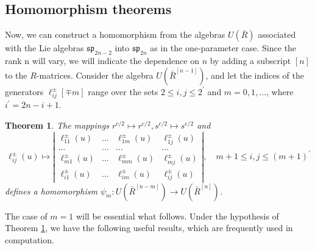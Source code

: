 \documentclass[10pt,a4paper]{amsart}
\newtheorem{theorem}{Theorem}
\numberwithin{equation}{section}
\begin{document}
	\subsection{ Homomorphism theorems}
	Now, we can construct a homomorphism from the algebras $U(\bar{R})$  associated with the Lie algebras $\mathfrak{s p}_{2 n-2}$ into $\mathfrak{s p}_{2 n}$ as in the one-parameter case.  Since the rank n will vary, we will indicate the dependence on $n$ by adding a subscript $[n]$ to the $R$-matrices. Consider the algebra $U\left(\bar{R}^{[n-1]}\right)$,  and let the indices of the generators $\ell_{i j}^{ \pm}[\mp m]$ range over the sets $2 \leqslant i, j \leqslant 2^{\prime}$ and $m=0,1, \ldots$, where $i^{\prime}=2 n-i+1$.
\begin{theorem}\label{t:homo}\cite{JLM2}
	The mappings $r^{c / 2} \mapsto r^{c / 2}, s^{c / 2} \mapsto s^{c / 2}$ and
	$$
	\ell_{i j}^{ \pm}(u) \mapsto\left|\begin{array}{cccc}
		\ell_{11}^{ \pm}(u) & \ldots & \ell_{1 m}^{ \pm}(u) & \ell_{1 j}^{ \pm}(u) \\
		\ldots & \ldots & \ldots & \ldots \\
		\ell_{m 1}^{ \pm}(u) & \ldots & \ell_{m m}^{ \pm}(u) & \ell_{m j}^{ \pm}(u) \\
		\ell_{i 1}^{ \pm}(u) & \ldots & \ell_{i m}^{ \pm}(u) & \boxed{\ell_{i j}^{ \pm}(u)}
	\end{array}\right|, \quad m+1 \leqslant i, j \leqslant(m+1)^{\prime}
	$$
	defines a homomorphism $\psi_m: U\left(\bar{R}^{[n-m]}\right) \rightarrow U\left(\bar{R}^{[n]}\right)$.
\end{theorem}
The case of $m=1$ will be essential what follows. Under the hypothesis of Theorem \ref{t:homo}, we have the following useful results, which are
frequently used in computation. %
\end{document}
